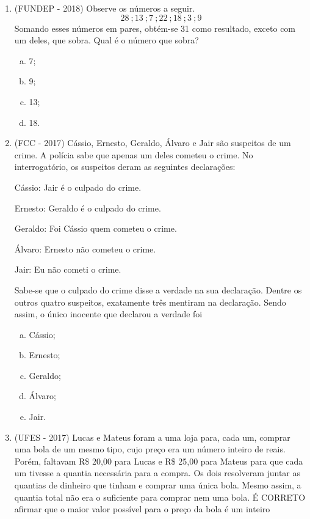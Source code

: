 \begin{enumerate}
\item (FUNDEP - 2018) Observe os números a seguir.
\[28 \ ; 13 \ ; 7 \ ; 22 \ ; 18 \ ; 3 \ ; 9 \]
Somando esses números em pares, obtém-se 31 como resultado, exceto com um deles, que sobra. Qual é o número que sobra?
\begin{multicols}{4}
\begin{enumerate}[a)]
\item 7;
\item 9;
\item 13;
\item 18.
\end{enumerate}
\end{multicols}

\item (FCC - 2017) Cássio, Ernesto, Geraldo, Álvaro e Jair são suspeitos de um crime. A polícia sabe que apenas um deles cometeu o crime. No interrogatório, os suspeitos deram as seguintes declarações:


Cássio: Jair é o culpado do crime.

Ernesto: Geraldo é o culpado do crime.

Geraldo: Foi Cássio quem cometeu o crime.

Álvaro: Ernesto não cometeu o crime.

Jair: Eu não cometi o crime.


Sabe-se que o culpado do crime disse a verdade na sua declaração. Dentre os outros quatro suspeitos, exatamente três mentiram na declaração. Sendo assim, o único inocente que declarou a verdade foi
\begin{multicols}{2}
\begin{enumerate}[a)]
\item Cássio;
\item Ernesto;
\item Geraldo;
\item Álvaro;
\item Jair.
\end{enumerate}
\end{multicols}

\item (UFES - 2017) Lucas e Mateus foram a uma loja para, cada um, comprar uma bola de um mesmo tipo, cujo preço era um número inteiro de reais. Porém, faltavam R\$ 20,00 para Lucas e R\$ 25,00 para Mateus para que cada um tivesse a quantia necessária para a compra. Os dois resolveram juntar as quantias de dinheiro que tinham e comprar uma única bola. Mesmo assim, a quantia total não era o suficiente para comprar nem uma bola. É CORRETO afirmar que o maior valor possível para o preço da bola é um inteiro


\end{enumerate}
